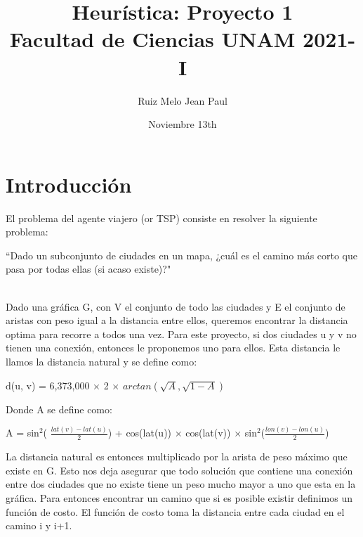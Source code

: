 \documentclass{article}
\title{Heurística: Proyecto 1 \\ Facultad de Ciencias UNAM 2021-I }
\author{Ruiz Melo Jean Paul}
\date{Noviembre 13th}
\begin{document}
\maketitle
    \section{Introducción}
    El problema del agente viajero (or TSP) consiste en resolver la siguiente problema:
    \begin{center}
    ``Dado un subconjunto de ciudades en un mapa, ¿cuál es el camino más corto que pasa por todas ellas (si
    acaso existe)?" 
    \end{center}\\ 
    
    Dado una gráfica G, con V el conjunto de todo las ciudades y E el conjunto de aristas con peso igual
    a la distancia entre ellos, queremos encontrar la distancia optima para recorre a todos una vez. Para este
    proyecto, si dos ciudades u y v no tienen una conexión, entonces le proponemos uno para ellos.
    Esta distancia le llamos la distancia natural y se define como:
    
    \begin{center}
        d(u, v) = 6,373,000 $\times$ 2 $\times$ $arctan(\sqrt{A},\sqrt{1-A})$
    \end{center} 
        Donde A se define como:
    \begin{center}
        A = sin$^{2}$( $\frac{lat(v) - lat(u)}{2}$) + cos(lat(u)) $\times$ cos(lat(v)) $\times$ sin$^{2}$($\frac{lon(v) - lon(u)}{2}$)
    \end{center}
    
    La distancia natural es entonces multiplicado por la arista de peso máximo que existe en G. Esto nos deja
    asegurar que todo solución que contiene una conexión entre dos ciudades que no existe tiene un peso
    mucho mayor a uno que esta en la gráfica. Para entonces encontrar un camino que si es posible existir
    definimos un función de costo. El función de costo toma la distancia entre cada ciudad en el camino i y i+1.
    \\
    
    
\end{document}
